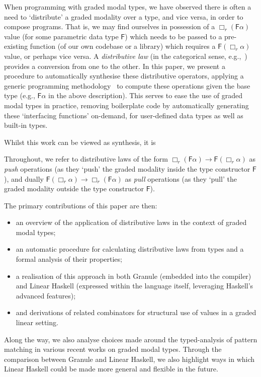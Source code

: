 When programming with graded modal types, we have observed
there is often a need to `distribute' a graded modality over a type, and
vice versa, in order to compose programs. That is,
we may find ourselves in possession of a $\Box_r (\mathsf{F} \alpha)$
value (for some parametric data type $\mathsf{F}$) which needs
to be passed to a pre-existing function (of our own codebase or a library) which requires
a $\mathsf{F} (\Box_r \alpha)$ value, or perhaps vice versa. A \emph{distributive
law} (in the categorical sense, e.g.,~\cite{street1972formal})
provides a conversion from one to the other.
In this paper, we present a procedure to automatically synthesise these
distributive operators, applying a generic programming
methodology~\cite{hinze2000new} to compute these operations given the
base type (e.g., $\mathsf{F} \alpha$ in the above description). This
serves to ease the use of graded modal types in practice, removing
boilerplate code by automatically generating these `interfacing
functions' on-demand, for user-defined data types as well as
built-in types.



Whilst this work can be viewed as synthesis, it is 


Throughout, we refer to distributive laws of the form
$\Box_r (\mathsf{F} \alpha) \rightarrow \mathsf{F} (\Box_r \alpha)$
as \emph{push} operations (as they `push' the graded modality inside
the type constructor $\mathsf{F}$), and dually
$\mathsf{F} (\Box_r \alpha) \rightarrow \Box_r (\mathsf{F} \alpha)$
as \emph{pull} operations (as they `pull' the graded modality outside
the type constructor $\mathsf{F}$).

The primary contributions of this paper are then:
%
\begin{itemize}[itemsep=0em,leftmargin=1em]
  \item an overview of the application of distributive laws
    in the context of graded modal types;
  \item an automatic procedure for calculating distributive laws from
    types and a formal analysis of their properties;
  \item a realisation of this approach in both Granule (embedded into
    the compiler) and Linear Haskell (expressed within the language itself, leveraging
    Haskell's advanced features);
  \item and derivations of related combinators for structural use
    of values in a graded linear setting.
\end{itemize}
%
Along the way, we also analyse choices made around the typed-analysis
of pattern matching in various recent works on graded modal types.
Through the comparison between Granule and Linear Haskell, we also
highlight ways in which Linear Haskell could be made more general
and flexible in the future.

